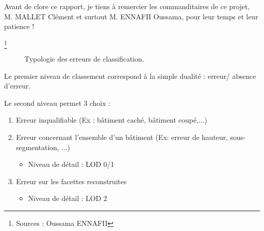 \documentclass{themeensg}
\begin{document}
Avant de clore ce rapport, je tiens à remercier les commanditaires de ce projet, M. MALLET Clément et surtout M. ENNAFII Oussama, pour leur temps et leur patience !

\newpage
\listoffigures


\begin{appendices} 
\label{beginappendices}
\label{annexeerreurs}
\footnote{Sources : Oussama ENNAFII}
\begin{sidewaysfigure}[p]
   \begin{center}
    
	\caption[Typologie des erreurs de classification]{\label{fig::mindmap_errors}Typologie des erreurs de classification.}
   \end{center}
\end{sidewaysfigure}

\noindent Le premier niveau de classement correspond à la simple dualité : erreur/ absence d'erreur.\newline

\noindent Le second niveau permet 3 choix : 
\begin{enumerate}
	\item Erreur inqualifiable (Ex : bâtiment caché, bâtiment coupé,...)
	\item Erreur concernant l'ensemble d'un bâtiment (Ex: erreur de hauteur, sous-segmentation, ...)
	\begin{itemize}[label=$\rightarrow$]
		\item Niveau de détail : LOD 0/1
	\end{itemize}
	\item Erreur sur les facettes reconstruites
	\begin{itemize}[label=$\rightarrow$]
		\item Niveau de détail : LOD 2
	\end{itemize}
\end{enumerate}

\end{appendices} 
\end{document}

